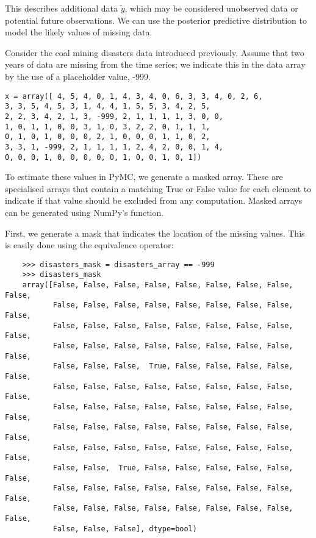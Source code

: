 This describes additional data $\tilde{y}$, which may be considered unobserved data or potential future observations. We can use the posterior predictive distribution to model the likely values of missing data.

Consider the coal mining disasters data introduced previously. Assume that two years of data are missing from the time series; we indicate this in the data array by the use of a placeholder value, -999. 

\begin{verbatim}
x = array([ 4, 5, 4, 0, 1, 4, 3, 4, 0, 6, 3, 3, 4, 0, 2, 6,
3, 3, 5, 4, 5, 3, 1, 4, 4, 1, 5, 5, 3, 4, 2, 5,
2, 2, 3, 4, 2, 1, 3, -999, 2, 1, 1, 1, 1, 3, 0, 0,
1, 0, 1, 1, 0, 0, 3, 1, 0, 3, 2, 2, 0, 1, 1, 1,
0, 1, 0, 1, 0, 0, 0, 2, 1, 0, 0, 0, 1, 1, 0, 2,
3, 3, 1, -999, 2, 1, 1, 1, 1, 2, 4, 2, 0, 0, 1, 4,
0, 0, 0, 1, 0, 0, 0, 0, 0, 1, 0, 0, 1, 0, 1])
\end{verbatim}

To estimate these values in PyMC, we generate a masked array. These are specialised arrays that contain a matching True or False value for each element to indicate if that value should be excluded from any computation. Masked arrays can be generated using NumPy's  function.

First, we generate a mask that indicates the location of the missing values. This is easily done using the equivalence operator:

\begin{verbatim}
	>>> disasters_mask = disasters_array == -999
	>>> disasters_mask
	array([False, False, False, False, False, False, False, False, False,
	       False, False, False, False, False, False, False, False, False,
	       False, False, False, False, False, False, False, False, False,
	       False, False, False, False, False, False, False, False, False,
	       False, False, False,  True, False, False, False, False, False,
	       False, False, False, False, False, False, False, False, False,
	       False, False, False, False, False, False, False, False, False,
	       False, False, False, False, False, False, False, False, False,
	       False, False, False, False, False, False, False, False, False,
	       False, False,  True, False, False, False, False, False, False,
	       False, False, False, False, False, False, False, False, False,
	       False, False, False, False, False, False, False, False, False,
	       False, False, False], dtype=bool)
\end{verbatim}

